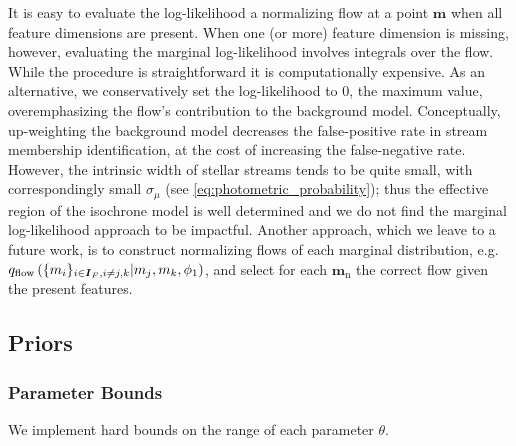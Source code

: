 \documentclass[twocolumn]{aastex631}
\newcommand{\mrm}[1]{\mathrm{#1}}
\newcommand{\mbs}[1]{\boldsymbol{#1}}
\newcommand{\nth}[1]{{#1}_{\mrm{n}}}  %
\begin{document}
            It is easy to evaluate the log-likelihood a normalizing flow at a point $\mbs{m}$ when all feature dimensions are present. When one (or more) feature dimension is missing, however, evaluating the marginal log-likelihood involves integrals over the flow. While the procedure is straightforward it is computationally expensive. As an alternative, we conservatively set the log-likelihood to $0$, the maximum value, overemphasizing the flow's contribution to the background model. Conceptually, up-weighting the background model decreases the false-positive rate in stream membership identification, at the
            cost of increasing the false-negative rate. However, the intrinsic width of stellar streams tends to be quite small, with correspondingly small $\sigma_\mu$ (see \autoref{eq:photometric_probability}); thus the effective region of the isochrone model is well determined and we do not find the marginal log-likelihood approach to be impactful. Another approach, which we leave to a future work, is to construct normalizing flows of each marginal distribution, e.g. $q_{\rm flow}\left(\{m_i\}_{i \in \mbs{I}_F, i \neq {j, k}} | m_j, m_k, \phi_1\right)$, and select for each $\nth{\mbs{m}}$ the correct flow given the present features.

    


    \subsection{Priors} \label{sub:priors}


        \subsubsection{Parameter Bounds}

            We implement hard bounds on the range of each parameter $\theta$.

            

    
\end{document}
